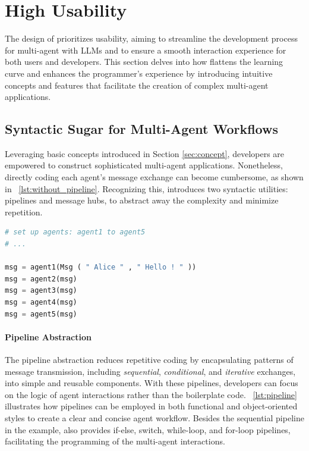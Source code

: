 \section{High Usability}
\label{sec:usability}

The design of \ours prioritizes usability, aiming to streamline the development process for multi-agent with LLMs and to ensure a smooth interaction experience for both users and developers. 
This section delves into how \ours flattens the learning curve and enhances the programmer's experience by introducing intuitive concepts and features that facilitate the creation of complex multi-agent applications.

\subsection{Syntactic Sugar for Multi-Agent Workflows}
Leveraging basic concepts introduced in Section \ref{sec:concept}, developers are empowered to construct sophisticated multi-agent applications. Nonetheless, directly coding each agent's message exchange can become cumbersome, as shown in \lstlistingname~\ref{lst:without_pipeline}. Recognizing this, \ours introduces two syntactic utilities: pipelines and message hubs, to abstract away the complexity and minimize repetition.

\begin{lstlisting}[language=Python, float=h, caption={Example of programming a sequential workflow with basic concepts in \ours.}, label={lst:without_pipeline}]
# set up agents: agent1 to agent5
# ...

msg = agent1(Msg ( " Alice " , " Hello ! " ))
msg = agent2(msg)
msg = agent3(msg)
msg = agent4(msg)
msg = agent5(msg)
\end{lstlisting}

\paragraph{Pipeline Abstraction} 
The pipeline abstraction reduces repetitive coding by encapsulating patterns of message transmission, including {\it sequential}, {\it conditional}, and {\it iterative} exchanges, into simple and reusable components. With these pipelines, developers can focus on the logic of agent interactions rather than the boilerplate code. \lstlistingname~\ref{lst:pipeline} illustrates how pipelines can be employed in both functional and object-oriented styles to create a clear and concise agent workflow.
Besides the sequential pipeline in the example, \ours also provides if-else, switch, while-loop, and for-loop pipelines, facilitating the programming of the multi-agent interactions.

